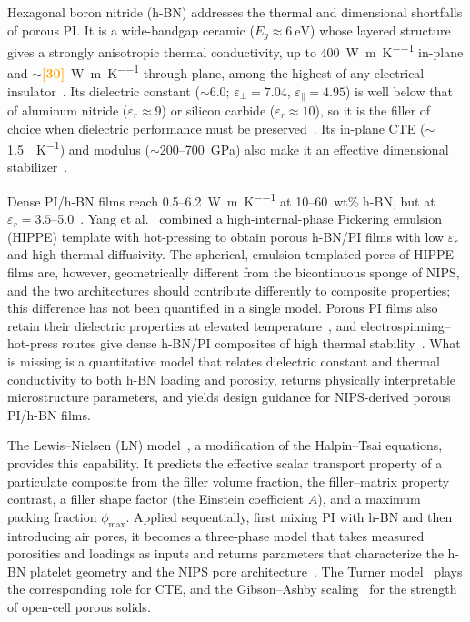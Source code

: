 \documentclass[preprint,a4paper]{elsarticle}
\newcommand{\eps}{\ensuremath{\varepsilon_r}}   %
\newcommand{\phimax}{\ensuremath{\phi_{\max}}}
\newcommand{\hl}[1]{\textcolor{orange}{\textbf{[#1]}}}
\begin{document}
Hexagonal boron nitride (h-BN) addresses the thermal and dimensional shortfalls of porous PI. It is a wide-bandgap ceramic ($E_g \approx \SI{6}{\electronvolt}$) whose layered structure gives a strongly anisotropic thermal conductivity, up to \SI{400}{\watt\per\meter\per\kelvin} in-plane and $\sim$\hl{30}~\si{\watt\per\meter\per\kelvin} through-plane, among the highest of any electrical insulator~\cite{guerra2019thermal}. Its dielectric constant ($\sim$6.0; $\varepsilon_\perp = 7.04$, $\varepsilon_\parallel = 4.95$) is well below that of aluminum nitride ($\eps \approx 9$) or silicon carbide ($\eps \approx 10$), so it is the filler of choice when dielectric performance must be preserved~\cite{gu2017dielectric}. Its in-plane CTE ($\sim$\SI{1.5}{\ppm\per\kelvin}) and modulus ($\sim$200--\SI{700}{\giga\pascal}) also make it an effective dimensional stabilizer~\cite{ou2021enhancement,guo2019enhanced}.

Dense PI/h-BN films reach 0.5--\SI{6.2}{\watt\per\meter\per\kelvin} at 10--60~wt\% h-BN, but at $\eps = 3.5$--5.0~\cite{jin2023ecofriendly,zhang2023controlled,zhao2023alkylated}. Yang et al.~\cite{yang2019porous} combined a high-internal-phase Pickering emulsion (HIPPE) template with hot-pressing to obtain porous h-BN/PI films with low \eps{} and high thermal diffusivity. The spherical, emulsion-templated pores of HIPPE films are, however, geometrically different from the bicontinuous sponge of NIPS, and the two architectures should contribute differently to composite properties; this difference has not been quantified in a single model. Porous PI films also retain their dielectric properties at elevated temperature~\cite{ma2022porous}, and electrospinning--hot-press routes give dense h-BN/PI composites of high thermal stability~\cite{gu2017dielectric}. What is missing is a quantitative model that relates dielectric constant and thermal conductivity to both h-BN loading and porosity, returns physically interpretable microstructure parameters, and yields design guidance for NIPS-derived porous PI/h-BN films.

The Lewis--Nielsen (LN) model~\cite{lewis1970dynamic,nielsen1973thermal}, a modification of the Halpin--Tsai equations, provides this capability. It predicts the effective scalar transport property of a particulate composite from the filler volume fraction, the filler--matrix property contrast, a filler shape factor (the Einstein coefficient $A$), and a maximum packing fraction \phimax. Applied sequentially, first mixing PI with h-BN and then introducing air pores, it becomes a three-phase model that takes measured porosities and loadings as inputs and returns parameters that characterize the h-BN platelet geometry and the NIPS pore architecture~\cite{progelhof1976methods}. The Turner model~\cite{turner1946thermal} plays the corresponding role for CTE, and the Gibson--Ashby scaling~\cite{gibson1997cellular} for the strength of open-cell porous solids.
\end{document}
